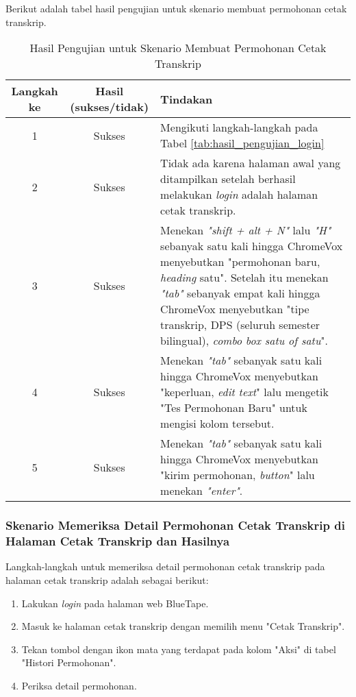 Berikut adalah tabel hasil pengujian untuk skenario membuat permohonan cetak transkrip.

\begin{table}[H]
    \centering 
    \caption{Hasil Pengujian untuk Skenario Membuat Permohonan Cetak Transkrip}
    \label{tab:hasil_pengujian_membuat_permohonan_cetak_transkrip}
    \begin{tabular}{|c|c|p{10cm}|}
        \toprule
        Langkah ke & Hasil (sukses/tidak) & Tindakan \\

        \midrule
        1 & Sukses & Mengikuti langkah-langkah pada Tabel \ref{tab:hasil_pengujian_login} \\
        2 & Sukses & Tidak ada karena halaman awal yang ditampilkan setelah berhasil melakukan \textit{login} adalah halaman cetak transkrip. \\
        3 & Sukses & Menekan \textit{"shift + alt + N"} lalu \textit{"H"} sebanyak satu kali hingga ChromeVox menyebutkan "permohonan baru, \textit{heading} satu". Setelah itu menekan \textit{"tab"} sebanyak empat kali hingga ChromeVox menyebutkan "tipe transkrip, DPS (seluruh semester bilingual), \textit{combo box satu of satu}". \\
        4 & Sukses & Menekan \textit{"tab"} sebanyak satu kali hingga ChromeVox menyebutkan "keperluan, \textit{edit text}" lalu mengetik "Tes Permohonan Baru" untuk mengisi kolom tersebut. \\
        5 & Sukses & Menekan \textit{"tab"} sebanyak satu kali hingga ChromeVox menyebutkan "kirim permohonan, \textit{button}" lalu menekan \textit{"enter"}. \\

        \bottomrule

    \end{tabular}
\end{table}

\subsubsection{Skenario Memeriksa Detail Permohonan Cetak Transkrip di Halaman Cetak Transkrip dan Hasilnya}
\label{subsubsec:skenario_memeriksa_detail_permohonan_cetak_transkrip_di_halaman_cetak_transkrip}
Langkah-langkah untuk memeriksa detail permohonan cetak transkrip pada halaman cetak transkrip adalah sebagai berikut:

\begin{enumerate}
    \item Lakukan \textit{login} pada halaman web BlueTape.
    \item Masuk ke halaman cetak transkrip dengan memilih menu "Cetak Transkrip".
    \item Tekan tombol dengan ikon mata yang terdapat pada kolom "Aksi" di tabel "Histori Permohonan".
    \item Periksa detail permohonan.
\end{enumerate}

